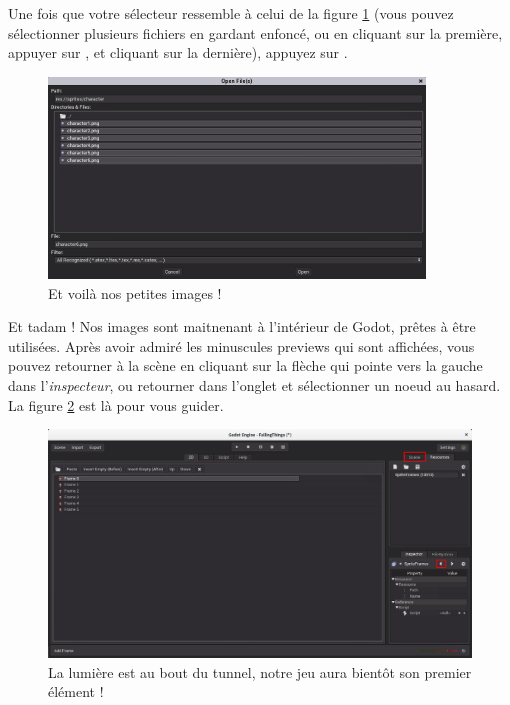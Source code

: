 Une fois que votre sélecteur ressemble à celui de la figure \ref{lvl1-fileselector} (vous pouvez sélectionner plusieurs fichiers en gardant  enfoncé, ou en cliquant sur la première, appuyer sur , et cliquant sur la dernière), appuyez sur .

\begin{figure}
  \begin{center}
    \includegraphics[width=10cm]{img/lvl1-fileselector.png}
  \end{center}
  \caption{\label{lvl1-fileselector} Et voilà nos petites images !}
\end{figure}

Et tadam ! Nos images sont maitnenant à l'intérieur de Godot, prêtes à être utilisées. Après avoir admiré les minuscules previews qui sont affichées, vous pouvez retourner à la scène en cliquant sur la flèche qui pointe vers la gauche dans l'\emph{inspecteur}, ou retourner dans l'onglet  et sélectionner un noeud au hasard. La figure \ref{lvl1-framesadded} est là pour vous guider.

\begin{figure}
  \begin{center}
    \includegraphics[width=12cm]{img/lvl1-framesadded.png}
  \end{center}
  \caption{\label{lvl1-framesadded} La lumière est au bout du tunnel, notre jeu aura bientôt son premier élément !}
\end{figure}

